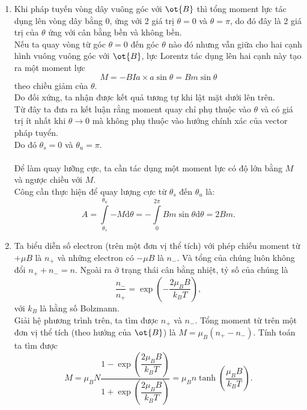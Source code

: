 \begin{loigiai}
    \begin{enumerate}[1)]
        \item Khi pháp tuyến vòng dây vuông góc với $\ot{B}$ thì tổng moment lực tác dụng lên vòng dây bằng 0, ứng với 2 giá trị $\theta=0$ và $\theta=\pi$, do đó đây là 2 giá trị của $\theta$ ứng với cân bằng bền và không bền.
        \\Nếu ta quay vòng từ góc $\theta=0$ đến góc $\theta$ nào đó nhưng vẫn giữa cho hai cạnh hình vuông vuông góc với $\ot{B}$, lực Lorentz tác dụng lên hai cạnh này tạo ra một moment lực \[M=-BIa\times a \sin{\theta}=Bm \sin{\theta}\]
        theo chiều giảm của $\theta$.
        \\ Do đối xứng, ta nhận được kết quả tương tự khi lật mặt dưới lên trên.
        \\ Từ đây ta đưa ra kết luận rằng moment quay chỉ phụ thuộc vào $\theta$ và có giá trị ít nhất khi $\theta \to 0$ mà không phụ thuộc vào hướng chính xác của vector pháp tuyển.
        \\ Do đó $\theta_s=0$ và $\theta_u=\pi$.
        \\\\Để làm quay lưỡng cực, ta cần tác dụng một moment lực có độ lớn bằng $M$ và ngược chiều với $M$.
        \\ Công cần thực hiện để quay lượng cực từ $\theta_s$ đến $\theta_u$ là:
        \[A = \int\limits_{{\theta _s}}^{{\theta _u}} { - M{\mathrm{d}}\theta }  =  - \int\limits_0^{2\pi } {{Bm}\sin \theta {\mathrm{d}}\theta }  = 2Bm.\]
        \item Ta biểu diễn số electron (trên một đơn vị thể tích) với phép chiếu moment từ  $+\mu B$ là $n_+$ và những electron có $-\mu B$ là $n_-$. Và tổng của chúng luôn không đổi $n_+ + n_-=n$. Ngoài ra ở trạng thái cân bằng nhiệt, tỷ số của chúng là
        \[\dfrac{n_-}{n_+}=\exp\left({-\dfrac{2\mu_BB }{k_BT}}\right),\]
        với $k_B$ là hằng số Bolzmann.
        \\ Giải hệ phương trình trên, ta tìm được $n_+$ và $n_-$. Tổng moment từ trên một đơn vị thể tích (theo hướng của $\ot{B}$) là $M=\mu_B (n_+ - n_-)$. Tính toán ta tìm được
        \[M=\mu_B N \dfrac{1-\exp\left({\dfrac{2\mu_B B}{k_B T}}\right)}{1 +\exp\left({\dfrac{2\mu_B B}{k_B T}}\right)}=\mu_Bn\tanh\left({\dfrac{\mu_BB}{k_BT}}\right).\]
        
    \end{enumerate}
\end{loigiai}
